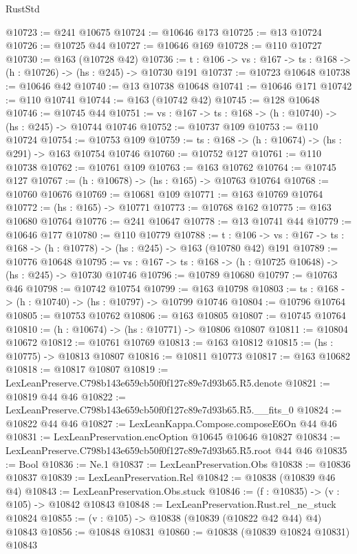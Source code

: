 \begin{lexlean}{RustStd}
\begin{coremodule}
@10723 := @241 @10675
@10724 := @10646 @173
@10725 := @13 @10724
@10726 := @10725 @44
@10727 := @10646 @169
@10728 := @110 @10727
@10730 := @163 (@10728 @42)
@10736 := {t : @106} -> {vs : @167} -> {ts : @168} -> (h : @10726) -> (hs : @245) -> @10730 @191
@10737 := @10723 @10648
@10738 := @10646 @42
@10740 := @13 @10738 @10648
@10741 := @10646 @171
@10742 := @110 @10741
@10744 := @163 (@10742 @42)
@10745 := @128 @10648
@10746 := @10745 @44
@10751 := {vs : @167} -> {ts : @168} -> (h : @10740) -> (hs : @245) -> @10744 @10746
@10752 := @10737 @109
@10753 := @110 @10724
@10754 := @10753 @109
@10759 := {ts : @168} -> (h : @10674) -> (hs : @291) -> @163 @10754 @10746
@10760 := @10752 @127
@10761 := @110 @10738
@10762 := @10761 @109
@10763 := @163 @10762
@10764 := @10745 @127
@10767 := (h : @10678) -> (hs : @165) -> @10763 @10764
@10768 := @10760 @10676
@10769 := @10681 @109
@10771 := @163 @10769 @10764
@10772 := (hs : @165) -> @10771
@10773 := @10768 @162
@10775 := @163 @10680 @10764
@10776 := @241 @10647
@10778 := @13 @10741 @44
@10779 := @10646 @177
@10780 := @110 @10779
@10788 := {t : @106} ->
  {vs : @167} -> {ts : @168} -> (h : @10778) -> (hs : @245) -> @163 (@10780 @42) @191
@10789 := @10776 @10648
@10795 := {vs : @167} -> {ts : @168} -> (h : @10725 @10648) -> (hs : @245) -> @10730 @10746
@10796 := @10789 @10680
@10797 := @10763 @46
@10798 := @10742 @10754
@10799 := @163 @10798
@10803 := {ts : @168} -> (h : @10740) -> (hs : @10797) -> @10799 @10746
@10804 := @10796 @10764
@10805 := @10753 @10762
@10806 := @163 @10805
@10807 := @10745 @10764
@10810 := (h : @10674) -> (hs : @10771) -> @10806 @10807
@10811 := @10804 @10672
@10812 := @10761 @10769
@10813 := @163 @10812
@10815 := (hs : @10775) -> @10813 @10807
@10816 := @10811 @10773
@10817 := @163 @10682
@10818 := @10817 @10807
@10819 := LexLeanPreserve.C798b143e659cb50f0f127c89e7d93b65.R5.denote
@10821 := @10819 @44 @46
@10822 := LexLeanPreserve.C798b143e659cb50f0f127c89e7d93b65.R5.__fits_0
@10824 := @10822 @44 @46
@10827 := LexLeanKappa.Compose.composeE6On @44 @46
@10831 := LexLeanPreservation.encOption @10645 @10646 @10827
@10834 := LexLeanPreserve.C798b143e659cb50f0f127c89e7d93b65.R5.root @44 @46
@10835 := Bool
@10836 := Ne.{1}
@10837 := LexLeanPreservation.Obs
@10838 := @10836 @10837
@10839 := LexLeanPreservation.Rel
@10842 := @10838 (@10839 @46 @4)
@10843 := LexLeanPreservation.Obs.stuck
@10846 := (f : @10835) -> (v : @105) -> @10842 @10843
@10848 := LexLeanPreservation.Rust.rel_ne_stuck @10824
@10855 := (v : @105) -> @10838 (@10839 (@10822 @42 @44) @4) @10843
@10856 := @10848 @10831
@10860 := @10838 (@10839 @10824 @10831) @10843

\end{coremodule}
\end{lexlean}
